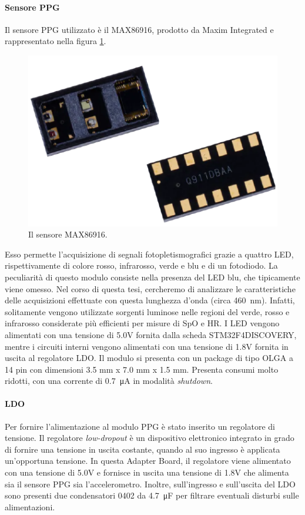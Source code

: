 \paragraph{Sensore PPG} Il sensore PPG utilizzato è il MAX86916, prodotto da Maxim Integrated e rappresentato nella figura \ref{fig:ImmagineMAX86916}.
\begin{figure}[b]
	\centering
	\includegraphics[width=0.6\linewidth]{ImageFiles/Hardware/ImmagineMAX86916}
	\caption{Il sensore MAX86916.}
	\label{fig:ImmagineMAX86916}
\end{figure}
Esso permette l'acquisizione di segnali fotopletismografici grazie a quattro LED, rispettivamente di colore rosso, infrarosso, verde e blu e di un fotodiodo. La peculiarità di questo modulo consiste nella presenza del LED blu, che tipicamente viene omesso. Nel corso di questa tesi, cercheremo di analizzare le caratteristiche delle acquisizioni effettuate con questa lunghezza d'onda (circa \SI{460}{\nano\meter}). Infatti, solitamente vengono utilizzate sorgenti luminose nelle regioni del verde, rosso e infrarosso considerate più efficienti per misure di SpO e HR. I LED vengono alimentati con una tensione di 5.0V fornita dalla scheda STM32F4DISCOVERY, mentre i circuiti interni vengono alimentati con una tensione di 1.8V fornita in uscita al regolatore LDO. Il modulo si presenta con un package di tipo OLGA a 14 pin con dimensioni 3.5 mm x 7.0 mm x 1.5 mm. Presenta consumi molto ridotti, con una corrente di \SI{0.7}{\micro\ampere} in modalità \textit{shutdown}.

\paragraph{LDO} Per fornire l'alimentazione al modulo PPG è stato inserito un regolatore di tensione. Il regolatore \textit{low-dropout} è un dispositivo elettronico integrato in grado di fornire una tensione in uscita costante, quando al suo ingresso è applicata un'opportuna tensione\cite{Horowitz2015}. In questa Adapter Board, il regolatore viene alimentato con una tensione di 5.0V e fornisce in uscita una tensione di 1.8V che alimenta sia il sensore PPG sia l'accelerometro. Inoltre, sull'ingresso e sull'uscita del LDO sono presenti due condensatori 0402 da \SI{4.7}{\micro\farad} per filtrare eventuali disturbi sulle alimentazioni.

